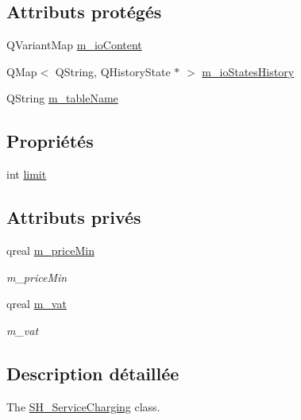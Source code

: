 \subsection*{Attributs protégés}
\begin{DoxyCompactItemize}
\item 
Q\-Variant\-Map \hyperlink{classSimpleHotel_1_1SH__InOutStateMachine_a4b0a3a48b0da31fddb724a357ad9b52c}{m\-\_\-io\-Content}
\item 
Q\-Map$<$ Q\-String, Q\-History\-State $\ast$ $>$ \hyperlink{classSimpleHotel_1_1SH__InOutStateMachine_a45a7defb15e50a196bc471017fc86eb4}{m\-\_\-io\-States\-History}
\item 
Q\-String \hyperlink{classSimpleHotel_1_1SH__InOutStateMachine_a15c063debdaa4c87bd4925867a13ce9e}{m\-\_\-table\-Name}
\end{DoxyCompactItemize}
\subsection*{Propriétés}
\begin{DoxyCompactItemize}
\item 
int \hyperlink{classSimpleHotel_1_1SH__LoopingInOutStateMachine_a5039255365e39a63520818168200b686}{limit}
\end{DoxyCompactItemize}
\subsection*{Attributs privés}
\begin{DoxyCompactItemize}
\item 
qreal \hyperlink{classSimpleHotel_1_1SH__ServiceCharging_a72f1c4a2c5ae6344b9e8a8dbd85f1029}{m\-\_\-price\-Min}
\begin{DoxyCompactList}\small\item\em m\-\_\-price\-Min \end{DoxyCompactList}\item 
qreal \hyperlink{classSimpleHotel_1_1SH__ServiceCharging_a4cb1fa10bbf8365734f68da006b887af}{m\-\_\-vat}
\begin{DoxyCompactList}\small\item\em m\-\_\-vat \end{DoxyCompactList}\end{DoxyCompactItemize}


\subsection{Description détaillée}
The \hyperlink{classSimpleHotel_1_1SH__ServiceCharging}{S\-H\-\_\-\-Service\-Charging} class. 

